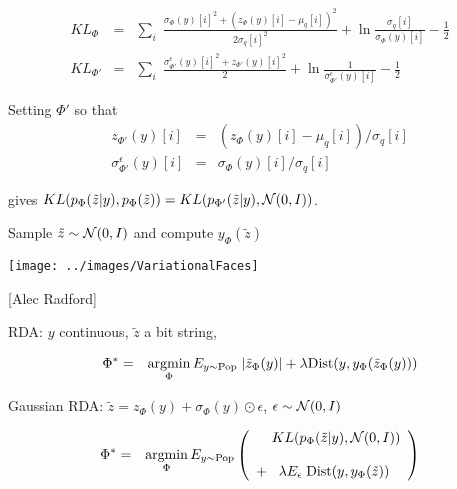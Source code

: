 {

\begin{eqnarray*}
KL_\Phi & = & \sum_i \;\frac{ \sigma_\Phi(y)[i]^2 +(z_\Phi(y)[i] - \mu_q[i])^2}{2\sigma_q[i]^2}
+ \ln\frac{\sigma_q[i]}{\sigma_\Phi(y)[i]} - \frac{1}{2}
\\
KL_{\Phi'} & = & \sum_i \;\frac{\sigma^\epsilon_{\Phi'}(y)[i]^2 +z_{\Phi'}(y)[i]^2}{2} + \ln\frac{1}{\sigma^\epsilon_{\Phi'}(y)[i]} - \frac{1}{2}
\end{eqnarray*}

Setting $\Phi'$ so that
\begin{eqnarray*}
z_{\Phi'}(y)[i] & = & (z_\Phi(y)[i] - \mu_q[i])/\sigma_q[i] \\
\sigma^\epsilon_{\Phi'}(y)[i] & = & \sigma_\Phi(y)[i]/\sigma_q[i]
\end{eqnarray*}

\vfill
gives {\color{red} $KL(p_{\Phi}(\tilde{z}|y),p_\Phi(\tilde{z})) = KL(p_{\Phi'}(\tilde{z}|y),{\cal N}(0,I))$}.


\centerline{Sample {\color{red} $\tilde{z} \sim {\cal N}(0,I)$} and compute {\color{red} $y_\Phi(\tilde{z})$}}
\vfill
\centerline{\texttt{[image: ../images/VariationalFaces]}}
\centerline{[Alec Radford]}


RDA: $y$ continuous, $\tilde{z}$ a bit string,

{\color{red}
\begin{eqnarray*}
\Phi^* &  = &  \operatorname*{argmin}_\Phi E_{y \sim \mathrm{Pop}} \;|\tilde{z}_\Phi(y)| + \lambda \mathrm{Dist}(y,y_\Phi(\tilde{z}_\Phi(y)))
\end{eqnarray*}
}

\vfill
Gaussian RDA: {\color{red} $\tilde{z} = z_\Phi(y) + \sigma_\Phi(y) \odot \epsilon$,\hspace{2em} $\epsilon \sim {\cal N}(0,I)$}

{\color{red}
\begin{eqnarray*}
\Phi^* & = & \operatorname*{argmin}_\Phi E_{y \sim \mathrm{Pop}}\left(\begin{array}{l}\;\;\; \;KL(p_\Phi(\tilde{z}|y),{\cal N}(0,I)) \\ \\ + \;\;\;\lambda E_\epsilon\; \mathrm{Dist}(y,y_\Phi(\tilde{z})) \end{array}\right)
\end{eqnarray*}
}


}

